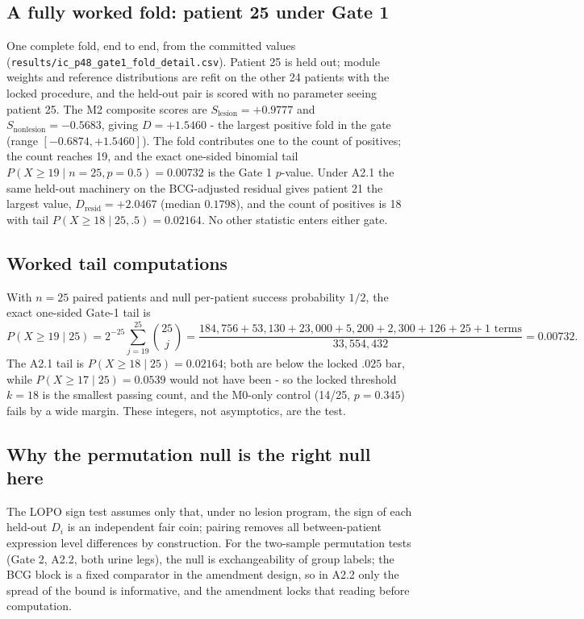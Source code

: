 \documentclass[11pt,a4paper]{article}
\begin{document}
\subsection{A fully worked fold: patient 25 under Gate 1}
One complete fold, end to end, from the committed values
(\texttt{results/ic\_p48\_gate1\_fold\_detail.csv}). Patient 25 is held
out; module weights and reference distributions are refit on the other 24
patients with the locked procedure, and the held-out pair is scored with no
parameter seeing patient 25. The M2 composite scores are
$S_{\mathrm{lesion}}=+0.9777$ and $S_{\mathrm{nonlesion}}=-0.5683$, giving
$D=+1.5460$ - the largest positive fold in the gate (range
$[-0.6874,+1.5460]$). The fold contributes one to the count of positives; the
count reaches 19, and the exact one-sided binomial tail
$P(X\geq19\mid n=25,p=0.5)=0.00732$ is the Gate 1 $p$-value. Under A2.1 the
same held-out machinery on the BCG-adjusted residual gives patient 21 the
largest value, $D_{\mathrm{resid}}=+2.0467$ (median $0.1798$), and the count
of positives is 18 with tail $P(X\geq18\mid25,.5)=0.02164$. No other
statistic enters either gate.

\subsection{Worked tail computations}
With $n=25$ paired patients and null per-patient success probability $1/2$,
the exact one-sided Gate-1 tail is
\begin{equation}
P(X\geq19\mid 25)=2^{-25}\sum_{j=19}^{25}\binom{25}{j}
=\frac{184{,}756+53{,}130+23{,}000+5{,}200+2{,}300+126+25+1\text{ terms}}{33{,}554{,}432}
=0.00732.
\end{equation}
The A2.1 tail is $P(X\geq18\mid25)=0.02164$; both are below the locked
$.025$ bar, while $P(X\geq17\mid25)=0.0539$ would not have been - so the
locked threshold $k=18$ is the smallest passing count, and the M0-only control
(14/25, $p=0.345$) fails by a wide margin. These integers, not asymptotics,
are the test.
\subsection{Why the permutation null is the right null here}
The LOPO sign test assumes only that, under no lesion program, the sign of
each held-out $D_i$ is an independent fair coin; pairing removes all
between-patient expression level differences by construction. For the
two-sample permutation tests (Gate 2, A2.2, both urine legs), the null is
exchangeability of group labels; the BCG block is a fixed comparator in the
amendment design, so in A2.2 only the spread of the bound is informative, and
the amendment locks that reading before computation.
\end{document}
